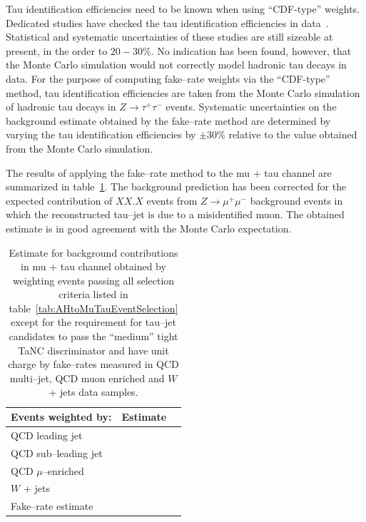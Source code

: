 Tau identification efficiencies need to be known when using ``CDF-type''
weights.  Dedicated studies have checked the tau identification efficiencies in
data~\cite{tauIdEff01,tauIdEff02}.  Statistical and systematic uncertainties of
these studies are still sizeable at present, in the order to $20-30\%$.  No
indication has been found, however, that the Monte Carlo simulation would not
correctly model hadronic tau decays in data.  For the purpose of computing
fake--rate weights via the ``CDF-type'' method, tau identification efficiencies
are taken from the Monte Carlo simulation of hadronic tau decays in $Z \to
\tau^{+} \tau^{-}$ events.  Systematic uncertainties on the background estimate
obtained by the fake--rate method are determined by varying the tau
identification efficiencies by $\pm 30\%$ relative to the value obtained from
the Monte Carlo simulation.

The results of applying the fake--rate method to the mu + tau channel are
summarized in table~\ref{tab:MuTauFakeRateResultsOS}.  The background prediction
has been corrected for the expected contribution of $XX.X$ events from $Z \to
\mu^{+} \mu^{-}$ background events in which the reconstructed tau--jet is due to
a misidentified muon.  The obtained estimate is in good agreement with the Monte
Carlo expectation.

\begin{table}[t]
\begin{center}
\tablesize
\begin{tabular}{|l|c|c|}
\hline
Events weighted by: & Estimate \\
\hline
QCD leading jet       & \\
QCD sub--leading jet      & \\
QCD $\mu$--enriched & \\
$W$ + jets          & \\
\hline
Fake--rate estimate & \\
\hline
\end{tabular}
\end{center}
\begin{center}
\caption[Fake--rate method results]{Estimate for background contributions in mu +
tau channel obtained by weighting events passing all selection criteria listed
in table~\ref{tab:AHtoMuTauEventSelection} except for the requirement for
tau--jet candidates to pass the ``medium'' tight TaNC discriminator and have
unit charge by fake--rates measured in QCD multi--jet, QCD muon enriched and $W$
+ jets data samples.} \label{tab:MuTauFakeRateResultsOS}
\end{center}
\end{table}


